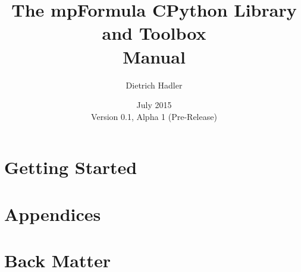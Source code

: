 \documentclass[12pt,a4paper,openany]{book}
\numberwithin{equation}{section}
\begin{document}
\begin{titlepage}
\author{
Dietrich Hadler
} 
\title{The mpFormula CPython Library and Toolbox\\[0.2cm]
 Manual} 
\date{July 2015 \\ 
Version {0.1}, Alpha 1 (Pre-Release)}
\maketitle
\end{titlepage}

\thispagestyle{empty}

\setcounter{page}{1}
\frontmatter
\maketitle

\setlength{\parindent}{0pt}



\tableofcontents
\listoftables
\listoffigures

\mainmatter
\setlength{\parindent}{0pt}

\part{Getting Started}



%


%


%


%
%


\part{Appendices}
\begin{appendices}

\end{appendices}


\part{Back Matter}
\backmatter
 
 
\printnomenclature[1.2in]
\printindex
\end{document}
